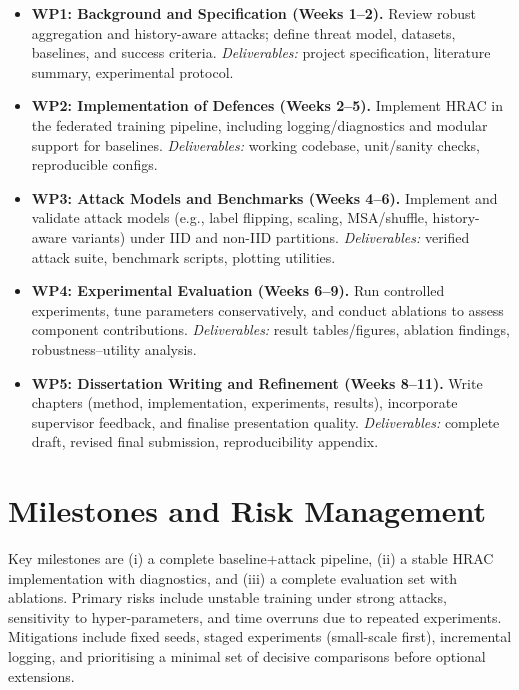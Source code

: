 \begin{itemize}
    \item \textbf{WP1: Background and Specification (Weeks 1--2).}
    Review robust aggregation and history-aware attacks; define threat model, datasets, baselines, and success criteria. 
    \textit{Deliverables:} project specification, literature summary, experimental protocol.

    \item \textbf{WP2: Implementation of Defences (Weeks 2--5).}
    Implement HRAC in the federated training pipeline, including logging/diagnostics and modular support for baselines.
    \textit{Deliverables:} working codebase, unit/sanity checks, reproducible configs.

    \item \textbf{WP3: Attack Models and Benchmarks (Weeks 4--6).}
    Implement and validate attack models (e.g., label flipping, scaling, MSA/shuffle, history-aware variants) under IID and non-IID partitions.
    \textit{Deliverables:} verified attack suite, benchmark scripts, plotting utilities.

    \item \textbf{WP4: Experimental Evaluation (Weeks 6--9).}
    Run controlled experiments, tune parameters conservatively, and conduct ablations to assess component contributions.
    \textit{Deliverables:} result tables/figures, ablation findings, robustness--utility analysis.

    \item \textbf{WP5: Dissertation Writing and Refinement (Weeks 8--11).}
    Write chapters (method, implementation, experiments, results), incorporate supervisor feedback, and finalise presentation quality.
    \textit{Deliverables:} complete draft, revised final submission, reproducibility appendix.
\end{itemize}

\section{Milestones and Risk Management}

Key milestones are (i) a complete baseline+attack pipeline, (ii) a stable HRAC implementation with diagnostics, and (iii) a complete evaluation set with ablations. Primary risks include unstable training under strong attacks, sensitivity to hyper-parameters, and time overruns due to repeated experiments. Mitigations include fixed seeds, staged experiments (small-scale first), incremental logging, and prioritising a minimal set of decisive comparisons before optional extensions.
